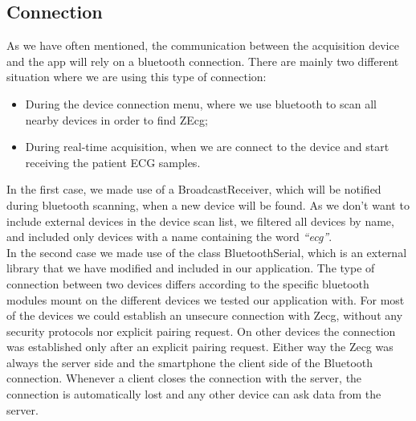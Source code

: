 \subsection{Connection}
As we have often mentioned, the communication between the acquisition device and the app will rely on a bluetooth connection. There are mainly two different situation where we are using this type of connection:
\begin{itemize}
	\item During the device connection menu, where we use bluetooth to scan all nearby devices in order to find ZEcg;
	\item During real-time acquisition, when we are connect to the device and start receiving the patient ECG samples.
\end{itemize}
In the first case, we made use of a BroadcastReceiver, which will be notified during bluetooth scanning, when a new device will be found. As we don’t want to include external devices in the device scan list, we filtered all devices by name, and included only devices with a name containing the word \textit{“ecg”}.\\
In the second case we made use of the class BluetoothSerial, which is an external library that we have modified and included in our application. The type of connection between two devices differs according to the specific bluetooth modules mount on the different devices we tested our application with. For most of the devices we could establish an unsecure connection with Zecg, without any  security protocols nor explicit  pairing request. On other devices the connection was established only after an explicit pairing request. Either way the Zecg was always the server side and the smartphone the client side of the Bluetooth connection. Whenever a client closes the connection with the server, the connection is automatically lost and any other device can ask data from the server.

